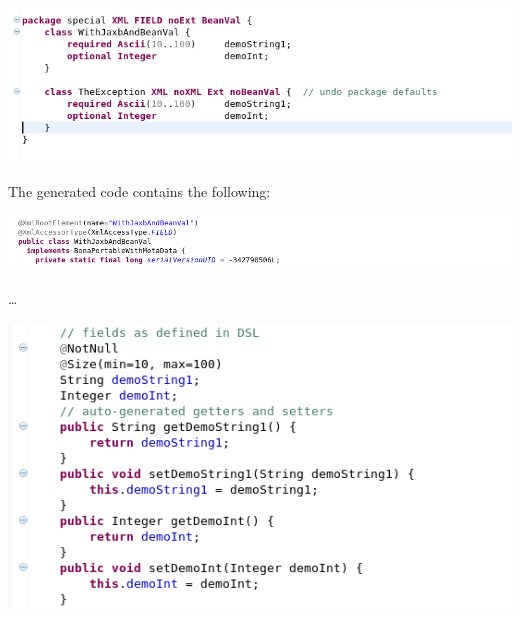 \documentclass[11pt,a4paper,oneside]{article}
\begin{document}
\hspace{1cm}\includegraphics[scale=0.5]{images/tut1-012-special.png}

\noindent The generated code contains the following:

\vspace{2mm}

\hspace{1cm}\includegraphics[scale=0.5]{images/tut1-012-special-1.png}

\ldots

\vspace{2mm}

\hspace{1cm}\includegraphics[scale=0.5]{images/tut1-012-special-2.png}
\end{document}
